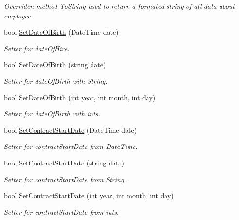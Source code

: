 \begin{DoxyCompactItemize}
\begin{DoxyCompactList}\small\item\em Overriden method To\+String used to return a formated string of all data about employee. \end{DoxyCompactList}\item 
bool \hyperlink{class_all_employees_1_1_contract_employee_a83870d3246c1ebd661e9125df1e1aae9}{Set\+Date\+Of\+Birth} (Date\+Time date)
\begin{DoxyCompactList}\small\item\em Setter for date\+Of\+Hire. \end{DoxyCompactList}\item 
bool \hyperlink{class_all_employees_1_1_contract_employee_ab4c953037180f89d84a2f96f65da87aa}{Set\+Date\+Of\+Birth} (string date)
\begin{DoxyCompactList}\small\item\em Setter for date\+Of\+Birth with String. \end{DoxyCompactList}\item 
bool \hyperlink{class_all_employees_1_1_contract_employee_a21695e3e1030af86e34384d4672d1ea6}{Set\+Date\+Of\+Birth} (int year, int month, int day)
\begin{DoxyCompactList}\small\item\em Setter for date\+Of\+Birth with ints. \end{DoxyCompactList}\item 
bool \hyperlink{class_all_employees_1_1_contract_employee_a012c48affde48858bda39a3cb9c802c4}{Set\+Contract\+Start\+Date} (Date\+Time date)
\begin{DoxyCompactList}\small\item\em Setter for contract\+Start\+Date from Date\+Time. \end{DoxyCompactList}\item 
bool \hyperlink{class_all_employees_1_1_contract_employee_aa10c777bc6b24385ceffaaff118e996e}{Set\+Contract\+Start\+Date} (string date)
\begin{DoxyCompactList}\small\item\em Setter for contract\+Start\+Date from String. \end{DoxyCompactList}\item 
bool \hyperlink{class_all_employees_1_1_contract_employee_af29121fe33b4f31b28eb545235a31331}{Set\+Contract\+Start\+Date} (int year, int month, int day)
\begin{DoxyCompactList}\small\item\em Setter for contract\+Start\+Date from ints. \end{DoxyCompactList}\item 

\end{DoxyCompactItemize}
